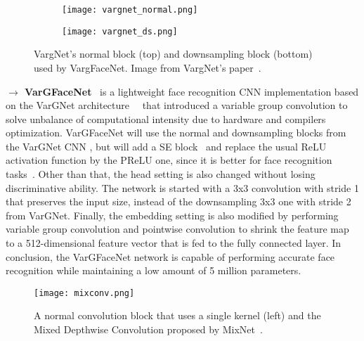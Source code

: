 \documentclass[class=report, crop=false, a4paper, 12pt]{standalone}
\begin{document}
\vspace{0.7\baselineskip}
\begin{figure}[H]
    \centering
    \begin{subfigure}{\textwidth}
        \centering
        \texttt{[image: vargnet\_normal.png]}
    \end{subfigure}
    
    \begin{subfigure}{\textwidth}
        \centering
        \texttt{[image: vargnet\_ds.png]}
    \end{subfigure}
    
    \caption[VargNet's normal and downsampling blocks used by VargFaceNet.]{VargNet's normal block (top) and downsampling block (bottom)~\autocite{zhangVarGNetVariableGroup2020} used by VargFaceNet. Image from VargNet's paper~\autocite{zhangVarGNetVariableGroup2020}.}
    \label{fig:vargnet}
\end{figure}

\noindent\textbf{$\rightarrow$ VarGFaceNet}~\autocite{yanVarGFaceNetEfficientVariable2019} is a lightweight face recognition CNN implementation based on the VarGNet architecture~\autocite{zhangVarGNetVariableGroup2020}~\autocite{chenMobileFaceNetsEfficientCNNs2018} that introduced a variable group convolution to solve unbalance of computational intensity due to hardware and compilers optimization. VarGFaceNet will use the normal and downsampling blocks from the VarGNet CNN , but will add a \gls{SE} block~\autocite{huSqueezeandExcitationNetworks2019} and replace the usual ReLU activation function by the \gls{PReLU} one, since it is better for face recognition tasks~\autocite{heDelvingDeepRectifiers2015}. Other than that, the head setting is also changed without losing discriminative ability. The network is started with a 3x3 convolution with stride 1 that preserves the input size, instead of the downsampling 3x3 one with stride 2 from VarGNet. Finally, the embedding setting is also modified by performing variable group convolution and pointwise convolution to shrink the feature map to a 512-dimensional feature vector that is fed to the fully connected layer. In conclusion, the VarGFaceNet network is capable of performing accurate face recognition while maintaining a low amount of 5 million parameters.

\vspace{0.7\baselineskip}
\begin{figure}[H]
    \centering
    \texttt{[image: mixconv.png]}
    \caption[A normal convolution block that uses a single kernel and the Mixed Depthwise Convolution proposed by MixNet.]{A normal convolution block that uses a single kernel (left) and the Mixed Depthwise Convolution proposed by MixNet~\autocite{tanMixConvMixedDepthwise}.}
    \label{fig:mixconv}
\end{figure}
\end{document}
